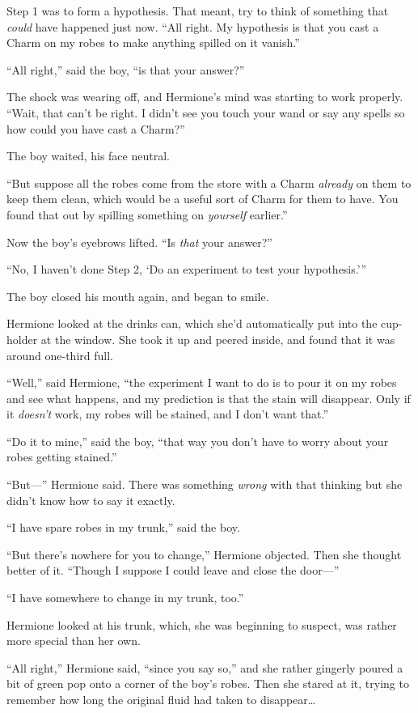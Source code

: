 Step 1 was to form a hypothesis. That meant, try to think of something that \emph{could} have happened just now. “All right. My hypothesis is that you cast a Charm on my robes to make anything spilled on it vanish.”

“All right,” said the boy, “is that your answer?”

The shock was wearing off, and Hermione’s mind was starting to work properly. “Wait, that can’t be right. I didn’t see you touch your wand or say any spells so how could you have cast a Charm?”

The boy waited, his face neutral.

“But suppose all the robes come from the store with a Charm \emph{already} on them to keep them clean, which would be a useful sort of Charm for them to have. You found that out by spilling something on \emph{yourself} earlier.”

Now the boy’s eyebrows lifted. “Is \emph{that} your answer?”

“No, I haven’t done Step 2, ‘Do an experiment to test your hypothesis.’”

The boy closed his mouth again, and began to smile.

Hermione looked at the drinks can, which she’d automatically put into the cup-holder at the window. She took it up and peered inside, and found that it was around one-third full.

“Well,” said Hermione, “the experiment I want to do is to pour it on my robes and see what happens, and my prediction is that the stain will disappear. Only if it \emph{doesn’t} work, my robes will be stained, and I don’t want that.”

“Do it to mine,” said the boy, “that way you don’t have to worry about your robes getting stained.”

“But—” Hermione said. There was something \emph{wrong} with that thinking but she didn’t know how to say it exactly.

“I have spare robes in my trunk,” said the boy.

“But there’s nowhere for you to change,” Hermione objected. Then she thought better of it. “Though I suppose I could leave and close the door—”

“I have somewhere to change in my trunk, too.”

Hermione looked at his trunk, which, she was beginning to suspect, was rather more special than her own.

“All right,” Hermione said, “since you say so,” and she rather gingerly poured a bit of green pop onto a corner of the boy’s robes. Then she stared at it, trying to remember how long the original fluid had taken to disappear…


